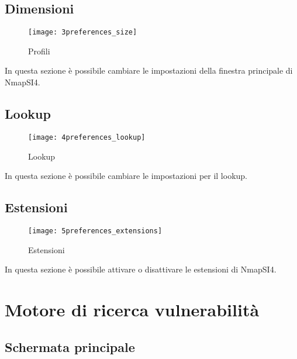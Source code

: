 \section{Dimensioni}
\label{sec:Dimensions}

\begin{figure}[h]
  \centering
  \texttt{[image: 3preferences\_size]}
  \caption{Profili}
  \label{fig:Profili}
\end{figure}
In questa sezione \`e possibile cambiare le impostazioni della finestra 
principale di NmapSI4.

\section{Lookup}
\label{sec_PreferencesLookup}

\begin{figure}[h]
  \centering
  \texttt{[image: 4preferences\_lookup]}
  \caption{Lookup}
  \label{fig:PreferencesLookup}
\end{figure}
In questa sezione \`e possibile cambiare le impostazioni per il lookup.

\section{Estensioni}
\label{sec:PreferencesExtensions}

\begin{figure}[h]
  \centering
  \texttt{[image: 5preferences\_extensions]}
  \caption{Estensioni}
  \label{fig:PreferencesExtensions}
\end{figure}
In questa sezione \`e possibile attivare o disattivare le estensioni di NmapSI4.

\chapter{Motore di ricerca vulnerabilit\`a}
\label{ch:Vulnerability}

\section{Schermata principale}
\label{sec:VulnerabilityMain}

